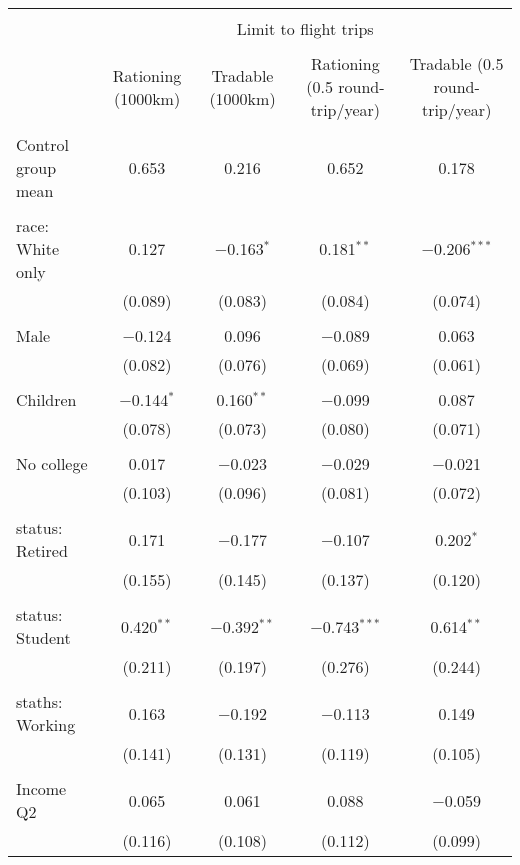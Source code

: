 
\begin{tabular}{@{\extracolsep{5pt}}lcccc} 
\\[-1.8ex]\hline 
\hline \\[-1.8ex] 
 & \multicolumn{4}{c}{Limit to flight trips} \\ 
\cline{2-5} 
\\[-1.8ex] & Rationing (1000km) & Tradable (1000km) & Rationing (0.5 round-trip/year) & Tradable (0.5 round-trip/year) \\ 
\hline \\[-1.8ex] 
 Control group mean & 0.653 & 0.216 & 0.652 & 0.178  \\ \hline \\[-1.8ex] race: White only & 0.127 & $-$0.163$^{*}$ & 0.181$^{**}$ & $-$0.206$^{***}$ \\ 
  & (0.089) & (0.083) & (0.084) & (0.074) \\ 
  & & & & \\ 
 Male & $-$0.124 & 0.096 & $-$0.089 & 0.063 \\ 
  & (0.082) & (0.076) & (0.069) & (0.061) \\ 
  & & & & \\ 
 Children & $-$0.144$^{*}$ & 0.160$^{**}$ & $-$0.099 & 0.087 \\ 
  & (0.078) & (0.073) & (0.080) & (0.071) \\ 
  & & & & \\ 
 No college & 0.017 & $-$0.023 & $-$0.029 & $-$0.021 \\ 
  & (0.103) & (0.096) & (0.081) & (0.072) \\ 
  & & & & \\ 
 status: Retired & 0.171 & $-$0.177 & $-$0.107 & 0.202$^{*}$ \\ 
  & (0.155) & (0.145) & (0.137) & (0.120) \\ 
  & & & & \\ 
 status: Student & 0.420$^{**}$ & $-$0.392$^{**}$ & $-$0.743$^{***}$ & 0.614$^{**}$ \\ 
  & (0.211) & (0.197) & (0.276) & (0.244) \\ 
  & & & & \\ 
 staths: Working & 0.163 & $-$0.192 & $-$0.113 & 0.149 \\ 
  & (0.141) & (0.131) & (0.119) & (0.105) \\ 
  & & & & \\ 
 Income Q2 & 0.065 & 0.061 & 0.088 & $-$0.059 \\ 
  & (0.116) & (0.108) & (0.112) & (0.099) \\ 

\end{tabular}
